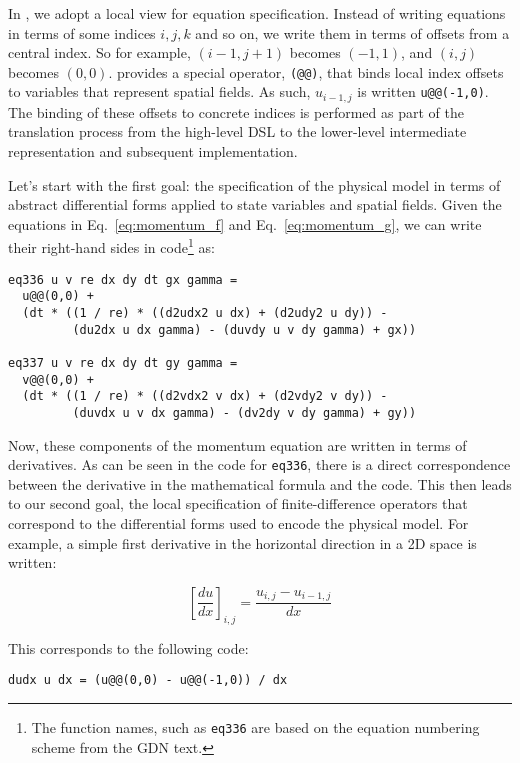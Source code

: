 In \FIDDLE, we adopt a local view for equation specification.  Instead of writing
equations in terms of some indices $i, j, k$ and so on, we write them in terms of
offsets from a central index.  So for example, $(i-1,j+1)$ becomes $(-1,1)$, 
and $(i,j)$ becomes $(0,0)$.  \FIDDLE provides a special operator, {\tt (@@)}, that
binds local index offsets to variables that represent spatial fields.  As such,
$u_{i-1,j}$ is written {\tt u@@(-1,0)}.  The binding of these offsets to concrete
indices is performed as part of the translation process from the high-level DSL to
the lower-level intermediate representation and subsequent implementation.

Let's start with the first goal: the specification of the physical model in terms
of abstract differential forms applied to state variables and spatial fields.
Given the equations in Eq.~\ref{eq:momentum_f} and Eq.~\ref{eq:momentum_g}, we can write their right-hand sides in code\footnote{The function names, such as {\tt eq336} are based on the equation numbering scheme from the GDN text.} as:

\begin{lstlisting}
eq336 u v re dx dy dt gx gamma = 
  u@@(0,0) +
  (dt * ((1 / re) * ((d2udx2 u dx) + (d2udy2 u dy)) -
         (du2dx u dx gamma) - (duvdy u v dy gamma) + gx))

eq337 u v re dx dy dt gy gamma =
  v@@(0,0) +
  (dt * ((1 / re) * ((d2vdx2 v dx) + (d2vdy2 v dy)) -
         (duvdx u v dx gamma) - (dv2dy v dy gamma) + gy))
\end{lstlisting}

Now, these components of the momentum equation are written in terms of derivatives.
As can be seen in the code for {\tt eq336}, there is a direct correspondence between
the derivative in the mathematical formula and the code.  This then leads to our
second goal, the local specification of finite-difference operators that correspond to
the differential forms used to encode the physical model.  For example, a simple 
first derivative in the horizontal direction in a 2D space is written:

\begin{equation}
\left[\frac{du}{dx}\right]_{i,j} = \frac{u_{i,j} - u_{i-1,j}}{dx}
\end{equation}

This corresponds to the following code:

\begin{lstlisting}
dudx u dx = (u@@(0,0) - u@@(-1,0)) / dx
\end{lstlisting}

